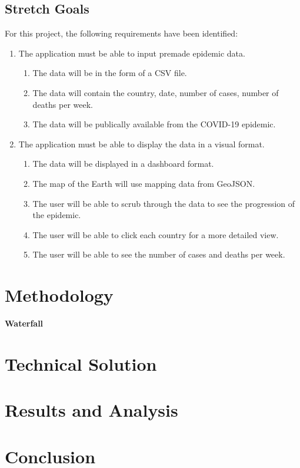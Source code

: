 \documentclass{article}
\begin{document}
\subsection{Stretch Goals}
For this project, the following requirements have been identified:
\begin{enumerate}
    \item The application must be able to input premade epidemic data.
    \begin{enumerate}
        \item The data will be in the form of a CSV file.
        \item The data will contain the country, date, number of cases, number of deaths per week.
        \item The data will be publically available from the COVID-19 epidemic.
    \end{enumerate}
    \item The application must be able to display the data in a visual format.
    \begin{enumerate}
        \item The data will be displayed in a dashboard format.
        \item The map of the Earth will use mapping data from GeoJSON.
        \item The user will be able to scrub through the data to see the progression of the epidemic.
        \item The user will be able to click each country for a more detailed view.
        \item The user will be able to see the number of cases and deaths per week.
    \end{enumerate}
\end{enumerate}
\newpage

\section{Methodology}
\textbf{\LARGE{Waterfall}}
\newpage

\section{Technical Solution}
\newpage

\section{Results and Analysis}
\newpage

\section{Conclusion}
\newpage
\end{document}

